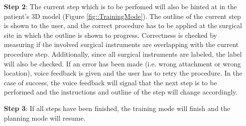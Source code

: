 \textbf{Step 2}: The current step which is to be perfomed will also be hinted at in the patient's 3D model (Figure \ref{fig::TrainingMode}).
The outline of the current step is shown to the user, and the correct procedure has to be applied at the surgical site in which the outline is shown to progress.
Correctness is checked by measuring if the involved surgical instruments are overlapping with the current procedure step.
Additionally, since all surgical instruments are labeled, the label will also be checked.
If an error has been made (i.e. wrong attachment or wrong location), voice feedback is given and the user has to retry the procedure.
In the case of success, the voice feedback will signal that the next step is to be performed and the instructions and outline of the step will change accordingly.

\textbf{Step 3}: If all steps have been finished, the training mode will finish and the planning mode will resume.
